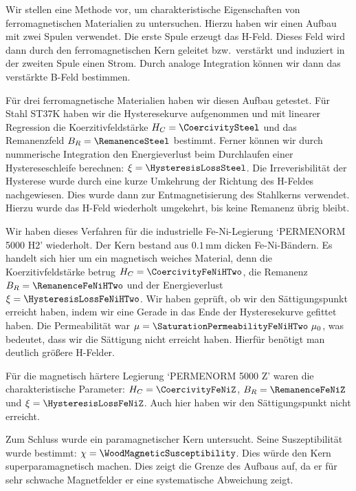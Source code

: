 \documentclass[a4paper,10pt,twocolumn]{article}
\newcommand{\stripThickness}{$0.1 \, \text{mm}$ }
\begin{document}
    Wir stellen eine Methode vor, um charakteristische Eigenschaften von ferromagnetischen Materialien zu untersuchen.
    Hierzu haben wir einen Aufbau mit zwei Spulen verwendet.
    Die erste Spule erzeugt das H-Feld.
    Dieses Feld wird dann durch den ferromagnetischen Kern geleitet bzw.\ verstärkt und induziert in der zweiten Spule
    einen Strom.
    Durch analoge Integration können wir dann das verstärkte B-Feld bestimmen.
    
    Für drei ferromagnetische Materialien haben wir diesen Aufbau getestet.
    Für Stahl ST37K haben wir die Hysteresekurve aufgenommen und mit linearer Regression die
    Koerzitivfeldstärke $H_C = \CoercivitySteel$ und das Remanenzfeld $B_R = \RemanenceSteel$
    bestimmt.
    Ferner können wir durch nummerische Integration den Energieverlust beim Durchlaufen einer
    Hystereseschleife berechnen: $\xi = \HysteresisLossSteel$.
    Die Irreverisbilität der Hysterese wurde durch eine kurze Umkehrung der Richtung des H-Feldes nachgewiesen.
    Dies wurde dann zur Entmagnetisierung des Stahlkerns verwendet.
    Hierzu wurde das H-Feld wiederholt umgekehrt, bis keine Remanenz übrig bleibt.
    
    Wir haben dieses Verfahren für die industrielle Fe-Ni-Legierung `PERMENORM 5000 H2' wiederholt.
    Der Kern bestand aus \stripThickness dicken Fe-Ni-Bändern.
    Es handelt sich hier um ein magnetisch weiches Material, denn die Koerzitivfeldstärke betrug
    $H_C = \CoercivityFeNiHTwo$, die Remanenz $B_R = \RemanenceFeNiHTwo$ und der Energieverlust
    $\xi = \HysteresisLossFeNiHTwo$.
    Wir haben geprüft, ob wir den Sättigungspunkt erreicht haben, indem wir eine Gerade in das Ende der Hysteresekurve
    gefittet haben.
    Die Permeabilität war $\mu = \SaturationPermeabilityFeNiHTwo \ \mu_0$, was bedeutet, dass
    wir die Sättigung nicht erreicht haben.
    Hierfür benötigt man deutlich größere H-Felder.
    
    Für die magnetisch härtere Legierung `PERMENORM 5000 Z' waren die charakteristische Parameter:
    $H_C = \CoercivityFeNiZ$, $B_R = \RemanenceFeNiZ$ und $\xi = \HysteresisLossFeNiZ$.
    Auch hier haben wir den Sättigungspunkt nicht erreicht.
    
    Zum Schluss wurde ein paramagnetischer Kern untersucht.
    Seine Suszeptibilität wurde bestimmt: $\chi = \WoodMagneticSusceptibility$.
    Dies würde den Kern superparamagnetisch machen.
    Dies zeigt die Grenze des Aufbaus auf, da er für sehr schwache Magnetfelder er eine systematische 
    Abweichung zeigt.
    
\end{document}
